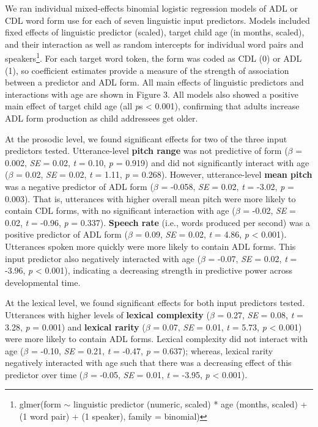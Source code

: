 \documentclass[10pt, letterpaper]{article}
\begin{document}
We ran individual mixed-effects binomial logistic regression models of
ADL or CDL word form use for each of seven linguistic input predictors.
Models included fixed effects of linguistic predictor (scaled), target
child age (in months, scaled), and their interaction as well as random
intercepts for individual word pairs and speakers\footnote{glmer(form
  \(\sim\) linguistic predictor (numeric, scaled) * age (months, scaled)
  + (1 \textbar{} word pair) + (1 \textbar{} speaker), family =
  binomial)}. For each target word token, the form was coded as CDL (0)
or ADL (1), so coefficient estimates provide a measure of the strength
of association between a predictor and ADL form. All main effects of
linguistic predictors and interactions with age are shown in Figure 3.
All models also showed a positive main effect of target child age (all
\emph{p}s \textless{} 0.001), confirming that adults increase ADL form
production as child addressees get older.

At the prosodic level, we found significant effects for two of the three
input predictors tested. Utterance-level \textbf{pitch range} was not
predictive of form (\(\beta\) = 0.002, \emph{SE} = 0.02, \emph{t} =
0.10, \emph{p} = 0.919) and did not significantly interact with age
(\(\beta\) = 0.02, \emph{SE} = 0.02, \emph{t} = 1.11, \emph{p} = 0.268).
However, utterance-level \textbf{mean pitch} was a negative predictor of
ADL form (\(\beta\) = -0.058, \emph{SE} = 0.02, \emph{t} = -3.02,
\emph{p} = 0.003). That is, utterances with higher overall mean pitch
were more likely to contain CDL forms, with no significant interaction
with age (\(\beta\) = -0.02, \emph{SE} = 0.02, \emph{t} = -0.96,
\emph{p} = 0.337). \textbf{Speech rate} (i.e., words produced per
second) was a positive predictor of ADL form (\(\beta\) = 0.09,
\emph{SE} = 0.02, \emph{t} = 4.86, \emph{p} \textless{} 0.001).
Utterances spoken more quickly were more likely to contain ADL forms.
This input predictor also negatively interacted with age (\(\beta\) =
-0.07, \emph{SE} = 0.02, \emph{t} = -3.96, \emph{p} \textless{} 0.001),
indicating a decreasing strength in predictive power across
developmental time.

At the lexical level, we found significant effects for both input
predictors tested. Utterances with higher levels of \textbf{lexical
complexity} (\(\beta\) = 0.27, \emph{SE} = 0.08, \emph{t} = 3.28,
\emph{p} = 0.001) and \textbf{lexical rarity} (\(\beta\) = 0.07,
\emph{SE} = 0.01, \emph{t} = 5.73, \emph{p} \textless{} 0.001) were more
likely to contain ADL forms. Lexical complexity did not interact with
age (\(\beta\) = -0.10, \emph{SE} = 0.21, \emph{t} = -0.47, \emph{p} =
0.637); whereas, lexical rarity negatively interacted with age such that
there was a decreasing effect of this predictor over time (\(\beta\) =
-0.05, \emph{SE} = 0.01, \emph{t} = -3.95, \emph{p} \textless{} 0.001).
\end{document}
